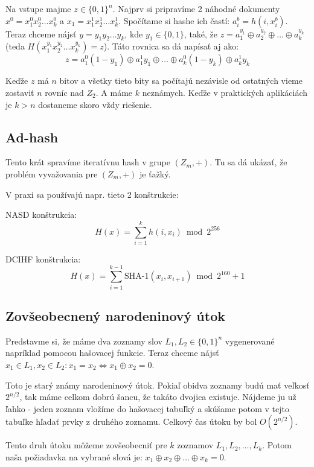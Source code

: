 Na vstupe majme $z \in \{0,1\}^n$. Najprv si pripravíme
2 náhodné dokumenty $x^0 = x_1^0 x_2^0 \dots x_k^0$ a 
$x_1 = x_1^1 x_2^1 \dots x_k^1$. Spočítame si hashe ich častí:
$a_i^b = h(i, x_i^b)$. 
Teraz chceme nájsť $y = y_1 y_2 \dots y_k$, kde $y_1 \in \{0,1\}$,
také, že $z = a_1^{y_1} \oplus a_2^{y_2} \oplus \dots \oplus a_k^{y_k}$
(teda $H(x_1^{y_1} x_2^{y_2} \dots x_k^{y_k}) = z$).
Táto rovnica sa dá napísať aj ako:
$$z = a_1^0 (1 - y_1) \oplus a_1^1 y_1 \oplus \dots \oplus a_k^0 (1 - y_k) \oplus a_k^1 y_k$$

Keďže $z$ má $n$ bitov a všetky tieto bity sa počítajú nezávisle od ostatných vieme
zostaviť $n$ rovníc nad $Z_2$. A máme $k$ neznámych. Keďže v praktických
aplikáciách je $k > n$ dostaneme skoro vždy riešenie.


\subsection{Ad-hash}

Tento krát spravíme iteratívnu hash v grupe $(Z_m, +)$.
Tu sa dá ukázať, že problém vyvažovania pre $(Z_m, +)$
je ťažký. 

V praxi sa používajú napr. tieto 2 konštrukcie:

NASD konštrukcia:
$$H(x) = \displaystyle\sum_{i=1}^k h(i, x_i) \bmod 2^{256}$$

DCIHF konštrukcia:
$$H(x) = \displaystyle\sum_{i=1}^{k-1} \textrm{SHA-1}(x_i, x_{i+1}) \bmod 2^{160}+1$$

\subsection{Zovšeobecnený narodeninový útok}

Predstavme si, že máme dva zoznamy slov $L_1, L_2 \in \{0,1\}^n$ vygenerované
napríklad pomocou hašovacej funkcie. Teraz chceme nájsť
$x_1 \in L_1, x_2 \in L_2\colon x_1 = x_2 \Leftrightarrow x_1 \oplus x_2 = 0$.

Toto je starý známy narodeninový útok. Pokiaľ obidva zoznamy budú mať veľkosť
$2^{n/2}$, tak máme celkom dobrú šancu, že takáto dvojica existuje. Nájdeme ju
už ľahko - jeden zoznam vložíme do hašovacej tabuľký a skúšame potom v tejto
tabuľke hľadať prvky z druhého zoznamu.
Celkový čas útoku by bol $O(2^{n/2})$.

Tento druh útoku môžeme zovšeobecniť pre $k$ zoznamov $L_1, L_2, \dots, L_k$.
Potom naša požiadavka na vybrané slová je: $x_1 \oplus x_2 \oplus \dots \oplus x_k = 0$.


